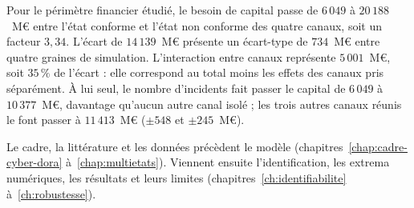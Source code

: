 Pour le périmètre financier étudié, le besoin de capital passe de
$6\,049$ à $20\,188$~M\euro{} entre l'état conforme et l'état non conforme des quatre canaux, soit un
facteur $3{,}34$. L'écart de $14\,139$~M\euro{} présente un écart-type de $734$~M\euro{} entre quatre graines de simulation.
L'interaction entre canaux représente $5\,001$~M\euro{}, soit $35\,\%$ de l'écart : elle correspond au total moins les effets des canaux pris séparément. À lui seul, le nombre d'incidents
fait passer le capital de $6\,049$ à $10\,377$~M\euro{}, davantage qu'aucun autre canal isolé ; les trois
autres canaux réunis le font passer à $11\,413$~M\euro{} ($\pm 548$ et $\pm 245$~M\euro{}).

Le cadre, la littérature et les données précèdent le modèle (chapitres~\ref{chap:cadre-cyber-dora} à~\ref{chap:multietats}). Viennent ensuite l'identification, les extrema numériques, les résultats et leurs limites (chapitres~\ref{ch:identifiabilite} à~\ref{ch:robustesse}).
